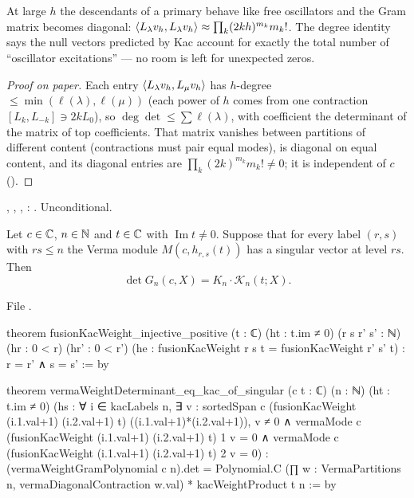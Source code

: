 \begin{physics}
At large $h$ the descendants of a primary behave like free oscillators and the Gram matrix becomes
diagonal: $\langle L_\lambda v_h,L_\lambda v_h\rangle\approx\prod_k(2kh)^{m_k}m_k!$. The degree identity
says the null vectors predicted by Kac account for exactly the total number of ``oscillator
excitations'' --- no room is left for unexpected zeros.
\end{physics}

\begin{proof}[Proof on paper]
Each entry $\langle L_\lambda v_h,L_\mu v_h\rangle$ has $h$-degree $\le\min(\ell(\lambda),\ell(\mu))$ (each power of
$h$ comes from one contraction $[L_k,L_{-k}]\ni2kL_0$), so $\deg\det\le\sum\ell(\lambda)$, with coefficient
the determinant of the matrix of top coefficients. That matrix vanishes between partitions of different
content (contractions must pair equal modes), is diagonal on equal content, and its diagonal entries are
$\prod_k(2k)^{m_k}m_k!\ne0$; it is independent of $c$ (\allowbreak{}\allowbreak{}).
\end{proof}

\begin{status}
\allowbreak{}\allowbreak{}\allowbreak{}\allowbreak{}, ,
\allowbreak{}\allowbreak{}\allowbreak{}\allowbreak{}\allowbreak{}, \allowbreak{}:
\lean{[propext, Classical.}\allowbreak{}\allowbreak\lean{sound]}. Unconditional.
\end{status}

\begin{theorem}\label{l06:thm:kaccond}
Let $c\in{\mathbb{C}}$, $n\in{\mathbb{N}}$ and $t\in{\mathbb{C}}$ with $\operatorname{Im}t\ne0$. Suppose that for every label $(r,s)$ with
$rs\le n$ the Verma module $M(c,h_{r,s}(t))$ has a singular vector at level $rs$. Then
\begin{equation*}
 \det G_n(c,X) = K_n\cdot\mathcal K_n(t;X).
\end{equation*}
\end{theorem}

File .
\begin{leancode}
theorem fusionKacWeight_injective_positive (t : ℂ) (ht : t.im ≠ 0)
    (r s r' s' : ℕ) (hr : 0 < r) (hr' : 0 < r')
    (he : fusionKacWeight r s t = fusionKacWeight r' s' t) : r = r' ∧ s = s' := by

theorem vermaWeightDeterminant_eq_kac_of_singular (c t : ℂ) (n : ℕ) (ht : t.im ≠ 0)
    (hs : ∀ i ∈ kacLabels n,
      ∃ v : sortedSpan c (fusionKacWeight (i.1.val+1) (i.2.val+1) t)
        ((i.1.val+1)*(i.2.val+1)), v ≠ 0 ∧
        vermaMode c (fusionKacWeight (i.1.val+1) (i.2.val+1) t) 1 v = 0 ∧
        vermaMode c (fusionKacWeight (i.1.val+1) (i.2.val+1) t) 2 v = 0) :
    (vermaWeightGramPolynomial c n).det =
      Polynomial.C (∏ w : VermaPartitions n, vermaDiagonalContraction w.val) *
        kacWeightProduct t n := by
\end{leancode}


